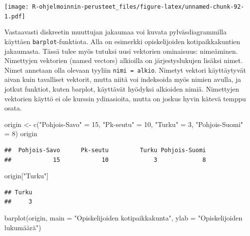 \documentclass[
]{book}
\newenvironment{Shaded}{\begin{snugshade}}{\end{snugshade}}
\newcommand{\AttributeTok}[1]{\textcolor[rgb]{0.77,0.63,0.00}{#1}}
\newcommand{\DecValTok}[1]{\textcolor[rgb]{0.00,0.00,0.81}{#1}}
\newcommand{\FunctionTok}[1]{\textcolor[rgb]{0.00,0.00,0.00}{#1}}
\newcommand{\NormalTok}[1]{#1}
\newcommand{\OtherTok}[1]{\textcolor[rgb]{0.56,0.35,0.01}{#1}}
\newcommand{\StringTok}[1]{\textcolor[rgb]{0.31,0.60,0.02}{#1}}
\begin{document}
\texttt{[image: R-ohjelmoinnin-perusteet\_files/figure-latex/unnamed-chunk-92-1.pdf]}

Vastaavasti diskreetin muuttujan jakaumaa voi kuvata pylväsdiagrammilla käyttäen \texttt{barplot}-funktiota. Alla on esimerkki opiskelijoiden kotipaikkakuntien jakaumasta. Tässä tulee myös tutuksi uusi vektorien ominaisuus: nimeäminen. Nimettyjen vektorien (named vectors) alkioilla on järjestyslukujen lisäksi nimet. Nimet annetaan olla olevaan tyyliin \texttt{nimi\ =\ alkio}. Nimetyt vektori käyttäytyvät aivan kuin tavalliset vektorit, mutta niitä voi indeksoida myös nimien avulla, ja jotkut funktiot, kuten barplot, käyttävät hyödyksi alkioiden nimiä. Nimettyjen vektorien käyttö ei ole kurssin ydinasioita, mutta on joskus hyvin kätevä temppu osata.

\begin{Shaded}
\begin{Highlighting}[]
\NormalTok{origin }\OtherTok{\textless{}{-}} \FunctionTok{c}\NormalTok{(}\StringTok{"Pohjois{-}Savo"} \OtherTok{=} \DecValTok{15}\NormalTok{, }\StringTok{"Pk{-}seutu"} \OtherTok{=} \DecValTok{10}\NormalTok{, }\StringTok{"Turku"} \OtherTok{=} \DecValTok{3}\NormalTok{,}
            \StringTok{"Pohjois{-}Suomi"} \OtherTok{=} \DecValTok{8}\NormalTok{)}
\NormalTok{origin}
\end{Highlighting}
\end{Shaded}

\begin{verbatim}
##  Pohjois-Savo      Pk-seutu         Turku Pohjois-Suomi 
##            15            10             3             8
\end{verbatim}

\begin{Shaded}
\begin{Highlighting}[]
\NormalTok{origin[}\StringTok{"Turku"}\NormalTok{]}
\end{Highlighting}
\end{Shaded}

\begin{verbatim}
## Turku 
##     3
\end{verbatim}

\begin{Shaded}
\begin{Highlighting}[]
\FunctionTok{barplot}\NormalTok{(origin, }
        \AttributeTok{main =} \StringTok{"Opiskelijoiden kotipaikkakunta"}\NormalTok{,}
        \AttributeTok{ylab =} \StringTok{"Opiskelijoiden lukumäärä"}\NormalTok{)}
\end{Highlighting}
\end{Shaded}
\end{document}
